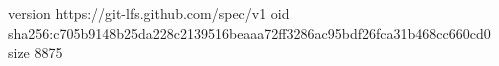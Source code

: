 version https://git-lfs.github.com/spec/v1
oid sha256:c705b9148b25da228c2139516beaaa72ff3286ac95bdf26fca31b468cc660cd0
size 8875
